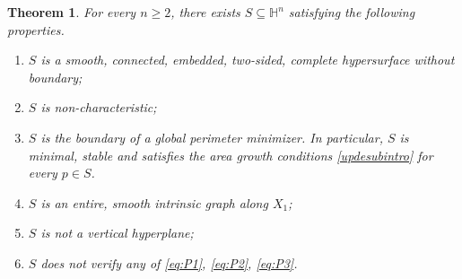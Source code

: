 \documentclass[11pt]{amsart}
\renewcommand{\geq}{\geqslant}
\newcommand{\hh}{{\mathbb{H}}}
\newtheorem{theorem}{Theorem}[section]
\theoremstyle{definition}
\theoremstyle{remark}
\numberwithin{equation}{section}
\begin{document}
\begin{theorem} \label{thm_no_rigidity}
    For every $n\geq 2$, there exists $S\subseteq\hh^n$ satisfying the following properties.     
    \begin{enumerate}
        \item $S$ is a smooth, connected, embedded, two-sided, complete hypersurface without boundary;
        \item $S$ is non-characteristic;
        \item $S$ is the boundary of a global perimeter minimizer. In particular, $S$ is minimal, stable and satisfies the area growth conditions \eqref{updesubintro} for every $p\in S$.
        \item $S$ is an entire, smooth intrinsic graph along $X_1$;
        \item $S$ is not a vertical hyperplane;
        \item $S$ does not verify any of \eqref{eq:P1}, \eqref{eq:P2}, \eqref{eq:P3}.
    \end{enumerate}
\end{theorem}
\end{document}
